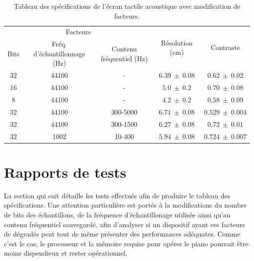 ﻿\documentclass[11pt,letterpaper]{article}
\begin{document}
\begin{table}[H]
    \centering
    \begin{tabular}{c c c | c c}
    \hline
    \multicolumn{3}{c|}{Facteurs} & \multirow{2}{*}{Résolution (cm)} & \multirow{2}{*}{Contraste} \\ 
    Bits & Fréq. d'échantillonnage (Hz) & Contenu fréquentiel (Hz) & & \\
    \hline
    32 & 44100 & - & $6.39\ \pm \ 0.08$ & $0.62 \ \pm\ 0.02$ \\
    16 & 44100 & - & $5.0\ \pm \ 0.2$ & $0.70 \ \pm\ 0.08$ \\
    8 & 44100 & - & $4.2 \ \pm\ 0.2$ & $0.58  \ \pm\ 0.09$ \\
    32 & 44100 & 300-5000 & $6.71\ \pm\ 0.08$ & $0.529\ \pm\ 0.004$ \\
    32 & 44100 & 300-1500 &	$6.27\ \pm\ 0.08$ &	$0.72\ \pm\ 0.01$ \\
    32 & 1002 & 10-400 & $5.94\ \pm\ 0.08$ & $0.724\ \pm\ 0.007$  \\
    \hline
    \end{tabular}
    \caption{Tableau des spécifications de l'écran tactile acoustique avec modification de facteurs.\label{specs}}
  \end{table}


\section{Rapports de tests}

La section qui suit détaille les tests effectués afin de produire le tableau des spécifications.
Une attention particulière est portée à la modifications du nombre de bits des échantillons, de
la fréquence d'échantillonage utilisée ainsi qu'au contenu fréquentiel sauvegardé, afin d'analyser
si un dispositif ayant ces facteurs de dégradés peut tout de même présenter des performances adéquates.
Comme c'est le cas, le processeur et la mémoire requise pour opérer le piano pourrait être moins dispendieux
et rester opérationnel.
\end{document}
